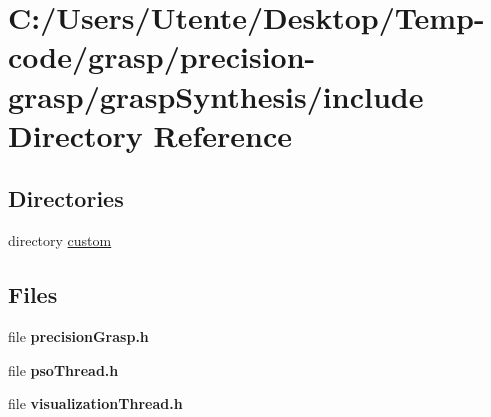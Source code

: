 \section{C\+:/\+Users/\+Utente/\+Desktop/\+Temp-\/code/grasp/precision-\/grasp/grasp\+Synthesis/include Directory Reference}
\label{dir_0c18a7b6a7fcb6256ca384888c844825}
\subsection*{Directories}
\begin{DoxyCompactItemize}
\item 
directory \hyperlink{dir_80be742c101516fca0e56eca16551e57}{custom}
\end{DoxyCompactItemize}
\subsection*{Files}
\begin{DoxyCompactItemize}
\item 
file {\bfseries precision\+Grasp.\+h}
\item 
file {\bfseries pso\+Thread.\+h}
\item 
file {\bfseries visualization\+Thread.\+h}
\end{DoxyCompactItemize}
